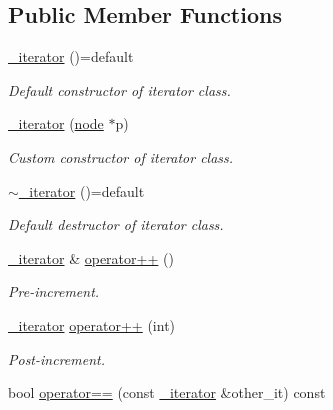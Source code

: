 \subsection*{Public Member Functions}
\begin{DoxyCompactItemize}
\item 
\mbox{\label{classbst_1_1__iterator_aee835330729dd908efe42460525aa057}} 
\hyperlink{classbst_1_1__iterator_aee835330729dd908efe42460525aa057}{\+\_\+iterator} ()=default
\begin{DoxyCompactList}\small\item\em Default constructor of iterator class. \end{DoxyCompactList}\item 
\hyperlink{classbst_1_1__iterator_a9c4c33751d4d0a8484855b48acd730a2}{\+\_\+iterator} (\hyperlink{structbst_1_1node}{node} $\ast$p)
\begin{DoxyCompactList}\small\item\em Custom constructor of iterator class. \end{DoxyCompactList}\item 
\mbox{\label{classbst_1_1__iterator_a7481f64723caf6b9cf090acbdcda5af4}} 
\hyperlink{classbst_1_1__iterator_a7481f64723caf6b9cf090acbdcda5af4}{$\sim$\+\_\+iterator} ()=default
\begin{DoxyCompactList}\small\item\em Default destructor of iterator class. \end{DoxyCompactList}\item 
\hyperlink{classbst_1_1__iterator}{\+\_\+iterator} \& \hyperlink{classbst_1_1__iterator_a37378dada06d3ceb1f802ab7288cd4ce}{operator++} ()
\begin{DoxyCompactList}\small\item\em Pre-\/increment. \end{DoxyCompactList}\item 
\hyperlink{classbst_1_1__iterator}{\+\_\+iterator} \hyperlink{classbst_1_1__iterator_a8f721fc01d751f322216b7f67ac0a4df}{operator++} (int)
\begin{DoxyCompactList}\small\item\em Post-\/increment. \end{DoxyCompactList}\item 
bool \hyperlink{classbst_1_1__iterator_a2faf29cee0b7d5e2ce002b5c9ae4070b}{operator==} (const \hyperlink{classbst_1_1__iterator}{\+\_\+iterator} \&other\+\_\+it) const

\end{DoxyCompactItemize}
